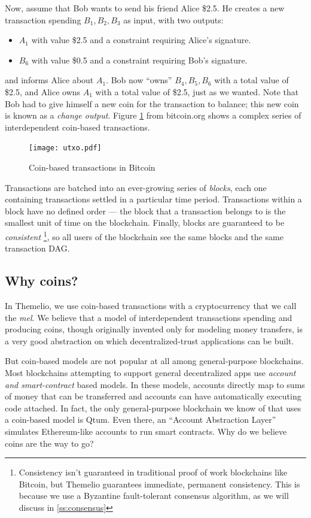 \documentclass[headinclude]{scrbook}
\begin{document}
Now, assume that Bob wants to send his friend Alice \$2.5. He creates a new transaction spending $B_1,B_2,B_3$ as input, with two outputs:
\begin{itemize}
    \item $A_1$ with value \$2.5 and a constraint requiring Alice's signature.
    \item $B_6$ with value \$0.5 and a constraint requiring Bob's signature.
\end{itemize}
and informs Alice about $A_1$. Bob now ``owns'' $B_4,B_5,B_6$ with a total value of \$2.5, and Alice owns $A_1$ with a total value of \$2.5, just as we wanted. Note that Bob had to give himself a new coin for the transaction to balance; this new coin is known as a \emph{change output}. Figure \ref{fig:utxo} from bitcoin.org shows a complex series of interdependent coin-based transactions.

\begin{figure}
    \centering \texttt{[image: utxo.pdf]}
    \caption{Coin-based transactions in Bitcoin}
    \label{fig:utxo}
\end{figure}


Transactions are batched into an ever-growing series of \emph{blocks}, each one containing transactions settled in a particular time period. Transactions within a block have no defined order --- the block that a transaction belongs to is the smallest unit of time on the blockchain. Finally, blocks are guaranteed to be \emph{consistent} \footnote{Consistency isn't guaranteed in traditional proof of work blockchains like Bitcoin, but Themelio guarantees immediate, permanent consistency. This is because we use a Byzantine fault-tolerant consensus algorithm, as we will discuss in \ref{ss:consensus}}, so all users of the blockchain see the same blocks and the same transaction DAG.

\subsection{Why coins?}

In Themelio, we use coin-based transactions with a cryptocurrency that we call the \emph{mel}. We believe that a model of interdependent transactions spending and producing coins, though originally invented only for modeling money transfers, is a very good abstraction on which decentralized-trust applications can be built.

But coin-based models are not popular at all among general-purpose blockchains. Most blockchains attempting to support general decentralized apps use \emph{account and smart-contract} based models. In these models, accounts directly map to sums of money that can be transferred and accounts can have automatically executing code attached. In fact, the only general-purpose blockchain we know of that uses a coin-based model is Qtum. Even there, an ``Account Abstraction Layer'' simulates Ethereum-like accounts to run smart contracts. Why do we believe coins are the way to go?
\end{document}
